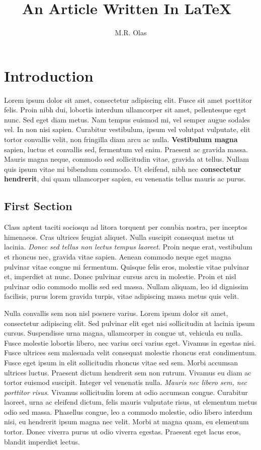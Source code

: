\documentclass[12pt, a4paper]{article}
\title{An Article Written In \LaTeX\ }
\author{M.R. Olas}
\begin{document}
\maketitle

\tableofcontents


\section{Introduction}
\label{sec:intro}

Lorem ipsum dolor sit amet, consectetur adipiscing elit. Fusce sit amet porttitor felis. Proin nibh dui, lobortis interdum ullamcorper sit amet, pellentesque eget nunc. Sed eget diam metus. Nam tempus euismod mi, vel semper augue sodales vel. In non nisi sapien. Curabitur vestibulum, ipsum vel volutpat vulputate, elit tortor convallis velit, non fringilla diam arcu ac nulla. \textbf{Vestibulum magna} sapien, luctus et convallis sed, fermentum vel enim. Praesent ac gravida massa. Mauris magna neque, commodo sed sollicitudin vitae, gravida at tellus. Nullam quis ipsum vitae mi bibendum commodo. Ut eleifend, nibh nec \textbf{consectetur hendrerit}, dui quam ullamcorper sapien, eu venenatis tellus mauris ac purus.

\subsection{First Section}
\label{subsec:intro:1}

Class aptent taciti sociosqu ad litora torquent per conubia nostra, per inceptos himenaeos. Cras ultrices feugiat aliquet. Nulla suscipit consequat metus ut lacinia. \textit{Donec sed tellus non lectus tempus laoreet.} Proin neque erat, vestibulum et rhoncus nec, gravida vitae sapien. Aenean commodo neque eget magna pulvinar vitae congue mi fermentum. Quisque felis eros, molestie vitae pulvinar et, imperdiet at nunc. Donec pulvinar cursus arcu in molestie. Proin et nisl pulvinar odio commodo mollis sed sed massa. Nullam aliquam, leo id dignissim facilisis, purus lorem gravida turpis, vitae adipiscing massa metus quis velit.

Nulla convallis sem non nisl posuere varius. Lorem ipsum dolor sit amet, consectetur adipiscing elit. Sed pulvinar elit eget nisi sollicitudin at lacinia ipsum cursus. Suspendisse urna magna, ullamcorper in congue ut, vehicula eu nulla. Fusce molestie lobortis libero, nec varius orci varius eget. Vivamus in egestas nisi. Fusce ultrices sem malesuada velit consequat molestie rhoncus erat condimentum. Fusce eget ipsum in elit sollicitudin rhoncus vitae sed sem. Morbi accumsan ultrices luctus. Praesent dictum hendrerit sem non rutrum. Vivamus eu diam ac tortor euismod suscipit. Integer vel venenatis nulla. \emph{Mauris nec libero sem, nec porttitor risus.} Vivamus sollicitudin lorem at odio accumsan congue. Curabitur laoreet, urna ac eleifend dictum, felis mauris vulputate risus, ut elementum metus odio sed massa. Phasellus congue, leo a commodo molestie, odio libero interdum nisi, eu hendrerit ipsum magna nec velit. Morbi at magna quam, eu elementum tortor. Donec viverra purus ut odio viverra egestas. Praesent eget lacus eros, blandit imperdiet lectus.
\end{document}

